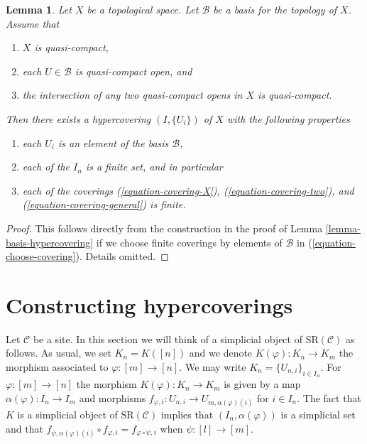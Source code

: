 \documentclass[10pt,a4paper]{article}
\theoremstyle{plain}
\newtheorem{lemma}[subsection]{Lemma}
\theoremstyle{definition}
\theoremstyle{remark}
\numberwithin{equation}{subsection}
\begin{document}
\begin{lemma}
\label{lemma-quasi-separated-quasi-compact-hypercovering}
Let $X$ be a topological space.
Let $\mathcal{B}$ be a basis for the topology of $X$.
Assume that
\begin{enumerate}
\item $X$ is quasi-compact,
\item each $U \in \mathcal{B}$ is quasi-compact open, and
\item the intersection of any two quasi-compact opens in
$X$ is quasi-compact.
\end{enumerate}
Then there exists a hypercovering $(I, \{U_i\})$ of $X$ with the
following properties
\begin{enumerate}
\item each $U_i$ is an element of the basis $\mathcal{B}$,
\item each of the $I_n$ is a finite set, and in particular
\item each of the coverings  (\ref{equation-covering-X}),
(\ref{equation-covering-two}), and (\ref{equation-covering-general})
is finite.
\end{enumerate}
\end{lemma}

\begin{proof}
This follows directly from the construction in the proof of
Lemma \ref{lemma-basis-hypercovering} if we choose finite coverings
by elements of $\mathcal{B}$ in (\ref{equation-choose-covering}).
Details omitted.
\end{proof}







\section{Constructing hypercoverings}
\label{section-hypercovering-sites}

\noindent
Let $\mathcal{C}$ be a site. In this section we will think of a
simplicial object of $\text{SR}(\mathcal{C})$ as follows.
As usual, we set $K_n = K([n])$ and we denote $K(\varphi) : K_n \to K_m$
the morphism associated to $\varphi : [m] \to [n]$.
We may write $K_n = \{U_{n, i}\}_{i \in I_n}$. For
$\varphi : [m] \to [n]$ the morphism $K(\varphi) : K_n \to K_m$
is given by a map $\alpha(\varphi) : I_n \to I_m$ and morphisms
$f_{\varphi, i} : U_{n, i} \to U_{m, \alpha(\varphi)(i)}$
for $i \in I_n$. The fact that $K$ is a simplicial object of
$\text{SR}(\mathcal{C})$ implies that $(I_n, \alpha(\varphi))$
is a simplicial set
and that $f_{\psi, \alpha(\varphi)(i)} \circ f_{\varphi, i} =
f_{\varphi \circ \psi, i}$ when $\psi : [l] \to [m]$.
\end{document}
